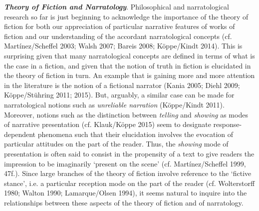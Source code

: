 \vspace{.2cm}
\noindent\textbf{\emph{Theory of Fiction and Narratology}}. Philosophical and narratological research so far is just beginning to acknowledge the importance of the theory of fiction for both our appreciation of particular narrative features of works of fiction and our understanding of the accordant narratological concepts (cf. Mart\'inez/Scheffel 2003; Walsh 2007; Bareis 2008; K\"oppe/Kindt 2014). This is surprising given that many narratological concepts are defined in terms of what is the case in a fiction, and given that the notion of truth in fiction is elucidated in the theory of fiction in turn. An example that is gaining more and more attention in the literature is the notion of a fictional narrator (Kania 2005; Diehl 2009; K\"oppe/St\"uhring 2011; 2015). But, arguably, a similar case can be made for narratological notions such as \emph{unreliable narration} (K\"oppe/Kindt 2011). Moreover, notions such as the distinction between \emph{telling} and \emph{showing} as modes of narrative presentation (cf. Klauk/K\"oppe 2015) seem to designate response-dependent phenomena such that their elucidation involves the evocation of particular attitudes on the part of the reader. Thus, the \emph{showing} mode of presentation is often said to consist in the propensity of a text to give readers the impression to be imaginarily `present on the scene' (cf. Mart\'inez/Scheffel 1999, 47f.). Since large branches of the theory of fiction involve reference to the `fictive stance', i.e. a particular reception mode on the part of the reader (cf. Wolterstorff 1980; Walton 1990; Lamarque/Olsen 1994), it seems natural to inquire into the relationships between these aspects of the theory of fiction and of narratology.


